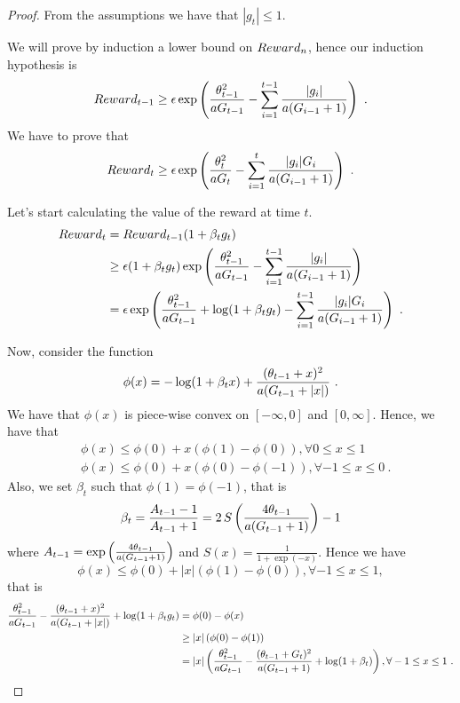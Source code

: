 \begin{proof}
From the assumptions we have that $|g_t|\leq 1$.

We will prove by induction a lower bound on $Reward_n$, hence our induction hypothesis is
\[
Reward_{t-1}\geq \epsilon \exp\left(\frac{\theta_{t-1}^2}{a G_{t-1}}- \sum_{i=1}^{t-1} \frac{|g_i|}{a (G_{i-1} + 1)}\right)~.
\]
We have to prove that 
\[
Reward_{t}\geq \epsilon \exp\left(\frac{\theta_{t}^2}{a G_t}- \sum_{i=1}^{t} \frac{|g_i| G_i}{a (G_{i-1} + 1)}\right)~.
\]

Let's start calculating the value of the reward at time $t$.
\begin{align*}
Reward_{t} &= Reward_{t-1} (1+\beta_t g_t) \\
&\geq \epsilon (1+\beta_t g_t)\exp\left(\frac{\theta_{t-1}^2}{a G_{t-1}}- \sum_{i=1}^{t-1} \frac{|g_i|}{a (G_{i-1} + 1) }\right) \\
&=  \epsilon \exp\left(\frac{\theta_{t-1}^2}{a G_{t-1}}+\log(1+\beta_t g_t)- \sum_{i=1}^{t-1} \frac{|g_i| G_i}{a (G_{i-1} + 1)}\right)~.
\end{align*}

Now, consider the function 
\[
\phi(x)=-\log(1+\beta_t x) + \frac{(\theta_{t-1}+x)^2}{a (G_{t-1} + |x|)}~.
\]
We have that $\phi(x)$ is piece-wise convex on $[-\infty,0]$ and $[0,\infty]$. Hence, we have that
\begin{align*}
&\phi(x) \leq \phi(0)+x (\phi(1)-\phi(0)), \forall 0 \leq x\leq 1\\
&\phi(x) \leq \phi(0)+x (\phi(0)-\phi(-1)), \forall -1 \leq x\leq 0~.
\end{align*}
Also, we set $\beta_t$ such that $\phi(1)=\phi(-1)$, that is
\[
\beta_t = \frac{A_{t-1}-1}{A_{t-1}+1} 
= 2 \, S\left(\frac{4 \theta_{t-1}}{a (G_{t-1} + 1)}\right)-1
\]
where $A_{t-1}=\exp\left(\frac{4 \theta_{t-1}}{a (G_{t-1} + 1)}\right)$ and
$S(x) =\frac{1}{1+\exp(-x)}$.
Hence we have
\[
\phi(x) \leq \phi(0)+ |x| (\phi(1)-\phi(0)), \forall -1 \leq x\leq 1,
\]
that is
\begin{align*}
\frac{\theta_{t-1}^2}{a G_{t-1}}-\frac{(\theta_{t-1}+x)^2}{a (G_{t-1} +  |x|)} + \log(1+\beta_t g_t) 
& = \phi(0) - \phi(x) \\
& \geq |x| \left(\phi(0) - \phi(1)\right) \\
&= |x| \left(\frac{\theta_{t-1}^2}{a G_{t-1}} - \frac{(\theta_{t-1}+G_t)^2}{a (G_{t-1} + 1)} + \log(1+\beta_t)\right), \forall -1 \leq x\leq 1~.
\end{align*}


\end{proof}
